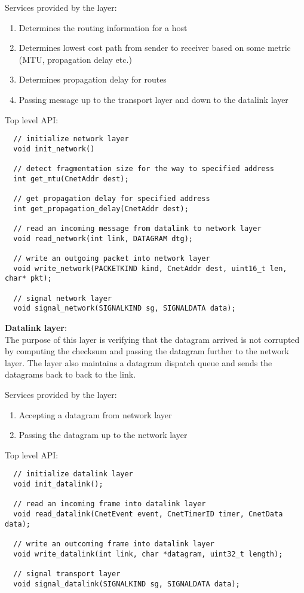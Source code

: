 \documentclass[11pt,a4paper,oneside]{report}
\begin{document}
Services provided by the layer:
\begin{enumerate}
  \item Determines the routing information for a host
  \item Determines lowest cost path from sender to receiver based on some metric
  (MTU, propagation delay etc.)
  \item Determines propagation delay for routes
  \item Passing message up to the transport layer and down to the datalink layer
\end{enumerate}
    
Top level API:
    
   \begin{lstlisting}
  // initialize network layer
  void init_network() 
  
  // detect fragmentation size for the way to specified address
  int get_mtu(CnetAddr dest);
  
  // get propagation delay for specified address
  int get_propagation_delay(CnetAddr dest);
  
  // read an incoming message from datalink to network layer
  void read_network(int link, DATAGRAM dtg);
  
  // write an outgoing packet into network layer
  void write_network(PACKETKIND kind, CnetAddr dest, uint16_t len, char* pkt);

  // signal network layer
  void signal_network(SIGNALKIND sg, SIGNALDATA data);

  \end{lstlisting}  
            
\noindent \textbf{Datalink layer}: \\
The purpose of this layer is verifying that the datagram arrived is not
corrupted by computing the checksum and passing the datagram further to
the network layer. The layer also maintains a datagram dispatch queue 
and sends the datagrams back to back to the link.
    
    Services provided by the layer:
    \begin{enumerate}
      \item Accepting a datagram from network layer
      \item Passing the datagram up to the network layer 
    \end{enumerate}
    \newpage
    Top level API:

    
  \begin{lstlisting}
  // initialize datalink layer
  void init_datalink();
  
  // read an incoming frame into datalink layer
  void read_datalink(CnetEvent event, CnetTimerID timer, CnetData data);
  
  // write an outcoming frame into datalink layer
  void write_datalink(int link, char *datagram, uint32_t length);
  
  // signal transport layer
  void signal_datalink(SIGNALKIND sg, SIGNALDATA data);
  \end{lstlisting} 
 
\end{document}
